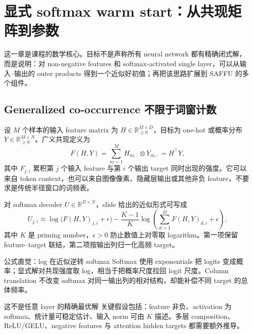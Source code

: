 \section{显式 softmax warm start：从共现矩阵到参数}

这一章是课程的数学核心。目标不是声称所有 neural network 都有精确闭式解，而是说明：对 non-negative features 和 softmax-activated single layer，可以从输入--输出的 outer products 得到一个近似好初值；再把该思路扩展到 SAFFU 的多个组件。

\subsection{Generalized co-occurrence 不限于词窗计数}

设 $M$ 个样本的输入 feature matrix 为 $H\in\mathbb{R}_{\ge 0}^{M\times D}$，目标为 one-hot 或概率分布 $Y\in\mathbb{R}_{\ge 0}^{M\times N}$。广义共现定义为
\[
F(H,Y)=\sum_{m=1}^{M}H_{m,:}\otimes Y_{m,:}=H^\top Y,
\]
其中 $F_{j,i}$ 累积第 $j$ 个输入 feature 与第 $i$ 个输出 target 同时出现的强度。它可以来自 token context，也可以来自图像像素、隐藏层输出或其他非负 feature，不要求是传统半径窗口的词频表。


对 softmax decoder $U\in\mathbb{R}^{D\times N}$，slide 给出的近似形式可写成
\[
U_{j,i}\approx \log\!\bigl(F(H,Y)_{j,i}+\epsilon\bigr)
-\frac{K-1}{K}\log\!\left(\sum_{d=1}^{D}F(H,Y)_{d,i}+\epsilon\right),
\]
其中 $K$ 是 priming number，$\epsilon>0$ 防止数值上对零取 logarithm。第一项保留 feature--target 联结，第二项按输出列归一化高频 target。

\begin{importantbox}{公式直觉：log 在近似逆转 softmax}
Softmax 使用 exponentials 把 logits 变成概率；显式解对共现强度取 log，相当于把概率尺度拉回 logit 尺度。Column translation 不改变 softmax 对同一输出列的相对结构，却能补偿不同 target 的总体频率。
\end{importantbox}

\begin{warningbox}{这不是任意 layer 的精确最优解}
关键假设包括：feature 非负、activation 为 softmax、统计量可稳定估计、输入 norm 可由 $K$ 描述。多层 composition、ReLU/GELU、negative features 与 attention hidden targets 都需要额外推导。
\end{warningbox}


